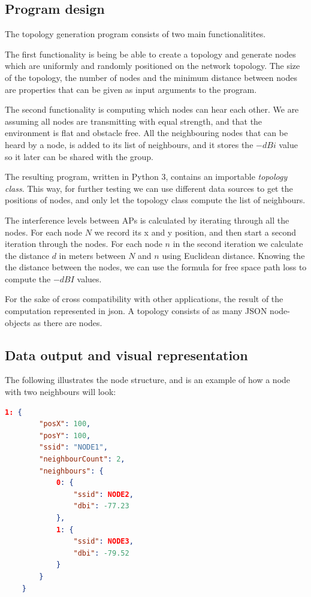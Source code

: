 \documentclass[a4paper,UKenglish]{report}
\begin{document}
\subsection{Program design}
The topology generation program consists of two main functionalitites.

The first functionality is being  be able to create a topology and generate nodes which are uniformly
and randomly positioned on the network topology. The size of the topology, the number of nodes and the minimum distance
between nodes are properties that can be given as input arguments to the program. 

The second functionality is computing which nodes can hear each other. We are assuming all nodes
are transmitting with equal strength, and that the environment is flat and obstacle free. 
All the neighbouring nodes that can be heard by a node, is added to its list of neighbours, and it stores the $-dBi$ value so it later can be shared with
the group. 

The resulting program, written in Python 3\cite{Python3}, contains an importable \textit{topology class}. This way, for further testing we can use different data sources to get the positions of nodes,
and only let the topology class compute the list of neighbours. 

The interference levels between APs is calculated by iterating through all the nodes. For each node $N$ we record its x and y position,
and then start a second iteration through the nodes. For each node $n$ in the second iteration we calculate the distance $d$ in
meters between $N$ and $n$ using Euclidean distance. Knowing the the distance between the nodes,  we can use the formula for free space path loss \cite{FSPL} to compute the $-dBI$ values.

For the sake of cross compatibility with other applications, the result of the computation represented in json. A topology consists of as
many JSON node-objects as there are nodes.


\subsection{Data output and visual representation} \label{simulationrep}
The following illustrates the node structure, and is an example of how a node with two neighbours will look: 

\begin{minipage}{\linewidth}
	\begin{lstlisting}[language=json]
	1: {
		"posX": 100,
		"posY": 100, 
		"ssid": "NODE1",
		"neighbourCount": 2, 
		"neighbours": {
			0: {
				"ssid": NODE2,
				"dbi": -77.23
			},
			1: {
				"ssid": NODE3,
				"dbi": -79.52
			}
		}
	}
	\end{lstlisting}
\end{minipage}
\end{document}
